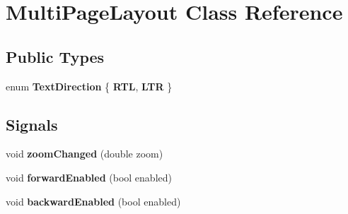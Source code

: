 \hypertarget{class_multi_page_layout}{
\section{MultiPageLayout Class Reference}
\label{class_multi_page_layout}
}
\subsection*{Public Types}
\begin{DoxyCompactItemize}
\item 
enum {\bfseries TextDirection} \{ {\bfseries RTL}, 
{\bfseries LTR}
 \}
\end{DoxyCompactItemize}
\subsection*{Signals}
\begin{DoxyCompactItemize}
\item 
\hypertarget{class_multi_page_layout_a54673078d71f0980ced96d5e30ad0cf7}{
void {\bfseries zoomChanged} (double zoom)}
\label{class_multi_page_layout_a54673078d71f0980ced96d5e30ad0cf7}

\item 
\hypertarget{class_multi_page_layout_ae8024a98a4fb6da9e92254824c3f9d0a}{
void {\bfseries forwardEnabled} (bool enabled)}
\label{class_multi_page_layout_ae8024a98a4fb6da9e92254824c3f9d0a}

\item 
\hypertarget{class_multi_page_layout_a49514bfc7c0d49774f82a76d60ddb016}{
void {\bfseries backwardEnabled} (bool enabled)}
\label{class_multi_page_layout_a49514bfc7c0d49774f82a76d60ddb016}

\end{DoxyCompactItemize}
